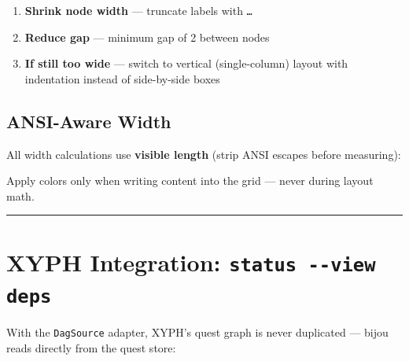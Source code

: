 \begin{enumerate}
\def\labelenumi{\arabic{enumi}.}
\tightlist
\item
  \textbf{Shrink node width} --- truncate labels with \texttt{…}
\item
  \textbf{Reduce gap} --- minimum gap of 2 between nodes
\item
  \textbf{If still too wide} --- switch to vertical (single-column) layout with indentation instead of side-by-side boxes
\end{enumerate}

\subsection{ANSI-Aware Width}\label{record-426-ansi-aware-width}

All width calculations use \textbf{visible length} (strip ANSI escapes before measuring):


Apply colors only when writing content into the grid --- never during layout math.

\begin{center}\rule{0.5\linewidth}{0.5pt}\end{center}

\section{\texorpdfstring{XYPH Integration: \texttt{s\allowbreak{}t\allowbreak{}a\allowbreak{}t\allowbreak{}u\allowbreak{}s\allowbreak{} \allowbreak{}-\allowbreak{}-\allowbreak{}v\allowbreak{}i\allowbreak{}e\allowbreak{}w\allowbreak{} \allowbreak{}d\allowbreak{}e\allowbreak{}p\allowbreak{}s}}{XYPH Integration: }}\label{record-426-xyph-integration-status---view-deps}

With the \texttt{D\allowbreak{}a\allowbreak{}g\allowbreak{}S\allowbreak{}o\allowbreak{}u\allowbreak{}r\allowbreak{}c\allowbreak{}e} adapter, XYPH's quest graph is never duplicated --- bijou reads directly from the quest store:

